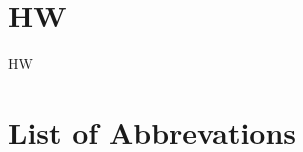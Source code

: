 \documentclass[cdoldfont]{tudscrreprt}
\begin{document}
  \section{\acl{HW}}
      \ac{HW}
  \section{List of Abbrevations}
    \begin{acronym}
    \end{acronym}
\end{document}
